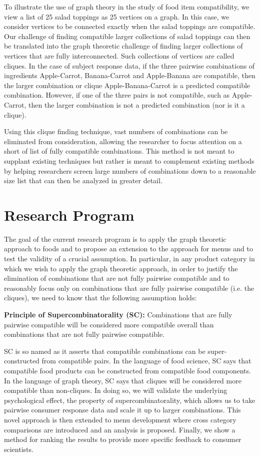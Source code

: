To illustrate the use of graph theory in the study of food item compatibility, we view a list of 25 salad toppings as 25 vertices on a graph.  In this case, we consider vertices to be connected exactly when the salad toppings are compatible.  Our challenge of finding compatible larger collections of salad toppings can then be translated into the graph theoretic challenge of finding larger collections of vertices that are fully interconnected.  Such collections of vertices are called cliques.  In the case of subject response data, if the three pairwise combinations of ingredients Apple-Carrot, Banana-Carrot and Apple-Banana are compatible, then the larger combination or clique Apple-Banana-Carrot is a predicted compatible combination.  However, if one of the three pairs is not compatible, such as Apple-Carrot, then the larger combination is not a predicted combination (nor is it a clique).  

Using this clique finding technique, vast numbers of combinations can be eliminated from consideration, allowing the researcher to focus attention on a short of list of fully compatible combinations.  This method is not meant to supplant existing techniques but rather is meant to complement existing methods by helping researchers screen large numbers of combinations down to a reasonable size list that can then be analyzed in greater detail.  

\section{Research Program}
The goal of the current research program is to apply the \citet{Ennisa} graph theoretic approach to foods and to propose an extension to the approach for menus and to test the validity of a crucial assumption.  In particular, in any product category in which we wish to apply the graph theoretic approach, in order to justify the elimination of combinations that are not fully pairwise compatible and to reasonably focus only on combinations that are fully pairwise compatible (i.e. the cliques), we need to know that the following assumption holds:

\noindent
{\bf Principle of Supercombinatorality (SC):} Combinations that are fully pairwise compatible will be considered more compatible overall than combinations that are not fully pairwise compatible.

SC is so named as it asserts that compatible combinations can be super-constructed from compatible pairs.  In the language of food science, SC says that compatible food products can be constructed from compatible food components.  In the language of graph theory, SC says that cliques will be considered more compatible than non-cliques.
In doing so, we will validate the underlying psychological effect, the property of supercombinatorality, which allows us to take pairwise consumer response data and scale it up to larger combinations.  This novel approach is then extended to menu development where cross category comparisons are introduced and an analysis is proposed.  Finally, we show a method for ranking the results to provide more specific feedback to consumer scientists.  

